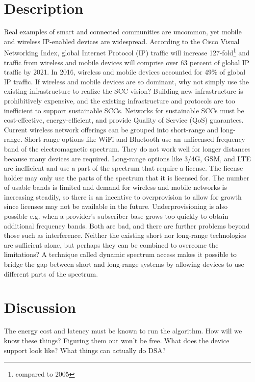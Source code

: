 \documentclass[]{article}
\begin{document}
\section{Description}
Real examples of smart and connected communities are uncommon, yet mobile and wireless IP-enabled devices are widespread. According to the Cisco Visual Networking Index, global Internet Protocol (IP) traffic will increase 127-fold\footnote{compared to 2005} and traffic from wireless and mobile devices will comprise over 63 percent of global IP traffic by 2021. In 2016, wireless and mobile devices accounted for 49\% of global IP traffic.\cite{cisco} If wireless and mobile devices are so dominant, why not simply use the existing infrastructure to realize the SCC vision? Building new infrastructure is prohibitively expensive, and the existing infrastructure and protocols are too inefficient to support sustainable SCCs. Networks for sustainable SCCs must be cost-effective, energy-efficient, and provide Quality of Service (QoS) guarantees.\cite{shah}
Current wireless network offerings can be grouped into short-range and long-range. Short-range options like WiFi and Bluetooth use an unlicensed frequency band of the electromagnetic spectrum. They do not work well for longer distances because many devices are required. Long-range options like 3/4G, GSM, and LTE are inefficient and use a part of the spectrum that require a license. The license holder may only use the parts of the spectrum that it is licensed for. The number of usable bands is limited and demand for wireless and mobile networks is increasing steadily, so there is an incentive to overprovision to allow for growth since licenses may not be available in the future. Underprovisioning is also possible e.g. when a provider's subscriber base grows too quickly to obtain additional frequency bands. Both are bad, and there are further problems beyond those such as interference. Neither the existing short nor long-range technologies are sufficient alone, but perhaps they can be combined to overcome the limitations?
A technique called dynamic spectrum access makes it possible to bridge the gap between short and long-range systems by allowing devices to use different parts of the spectrum.

\section{Discussion}
The energy cost and latency must be known to run the algorithm. How will we know these things? Figuring them out won't be free.
What does the device support look like? What things can actually do DSA?



\end{document}
